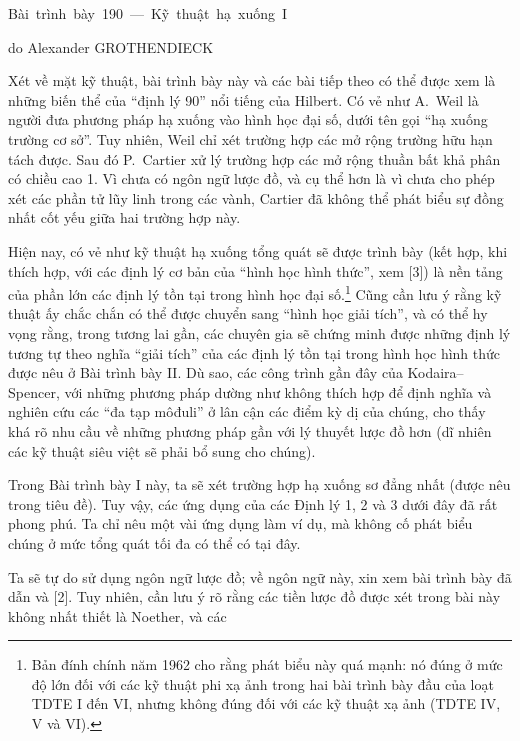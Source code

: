 \unit{Bài trình bày 190 — Kỹ thuật hạ xuống I}
%
  {do Alexander GROTHENDIECK}

Xét về mặt kỹ thuật, bài trình bày này và các bài tiếp theo có thể được xem là
những biến thể của ``định lý 90'' nổi tiếng của Hilbert. Có vẻ như A.~Weil là
người đưa phương pháp hạ xuống vào hình học đại số, dưới tên gọi ``hạ xuống
trường cơ sở''. Tuy nhiên, Weil chỉ xét trường hợp các mở rộng trường hữu hạn
tách được. Sau đó P.~Cartier xử lý trường hợp các mở rộng thuần bất khả phân có
chiều cao 1. Vì chưa có ngôn ngữ lược đồ, và cụ thể hơn là vì chưa cho phép xét
các phần tử lũy linh trong các vành, Cartier đã không thể phát biểu sự đồng nhất
cốt yếu giữa hai trường hợp này.

Hiện nay, có vẻ như kỹ thuật hạ xuống tổng quát sẽ được trình bày (kết hợp, khi
thích hợp, với các định lý cơ bản của ``hình học hình thức'', xem [3]) là nền
tảng của phần lớn các định lý tồn tại trong hình học đại số.\footnote{Bản đính
chính năm 1962 cho rằng phát biểu này quá mạnh: nó đúng ở mức độ lớn đối với
các kỹ thuật phi xạ ảnh trong hai bài trình bày đầu của loạt TDTE I đến VI,
nhưng không đúng đối với các kỹ thuật xạ ảnh (TDTE IV, V và VI).} Cũng cần lưu
ý rằng kỹ thuật ấy chắc chắn có thể được chuyển sang ``hình học giải tích'', và
có thể hy vọng rằng, trong tương lai gần, các chuyên gia sẽ chứng minh được
những định lý tương tự theo nghĩa ``giải tích'' của các định lý tồn tại trong
hình học hình thức được nêu ở Bài trình bày II. Dù sao, các công trình gần đây của
Kodaira--Spencer, với những phương pháp dường như không thích hợp để định nghĩa
và nghiên cứu các ``đa tạp môđuli'' ở lân cận các điểm kỳ dị của chúng, cho thấy
khá rõ nhu cầu về những phương pháp gần với lý thuyết lược đồ hơn (dĩ nhiên các
kỹ thuật siêu việt sẽ phải bổ sung cho chúng).

Trong Bài trình bày I này, ta sẽ xét trường hợp hạ xuống sơ đẳng nhất (được nêu
trong tiêu đề). Tuy vậy, các ứng dụng của các Định lý 1, 2 và 3 dưới đây đã rất
phong phú. Ta chỉ nêu một vài ứng dụng làm ví dụ, mà không cố phát biểu chúng ở
mức tổng quát tối đa có thể có tại đây.

Ta sẽ tự do sử dụng ngôn ngữ lược đồ; về ngôn ngữ này, xin xem bài trình bày đã
dẫn và [2]. Tuy nhiên, cần lưu ý rõ rằng các tiền lược đồ được xét trong bài này
không nhất thiết là Noether, và các

